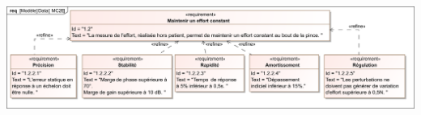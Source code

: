 \documentclass[10pt,fleqn]{article} %
\begin{document}
\begin{center}
\includegraphics[width=.95\linewidth]{images/mc2e}
\end{center}
\fi
\end{document}
